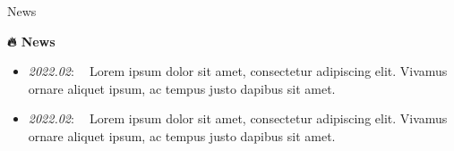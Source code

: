 \begin{section}{News}
\label{sec:news}

\begin{center}
\huge{\textbf{🔥 News}}
\end{center}

\begin{itemize}
  \item \textit{2022.02}: 🎉🎉 Lorem ipsum dolor sit amet, consectetur adipiscing elit. Vivamus ornare aliquet ipsum, ac tempus justo dapibus sit amet.
  \item \textit{2022.02}: 🎉🎉 Lorem ipsum dolor sit amet, consectetur adipiscing elit. Vivamus ornare aliquet ipsum, ac tempus justo dapibus sit amet.
\end{itemize}
\end{section} 